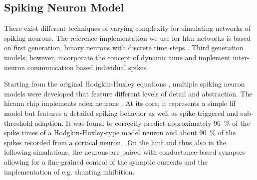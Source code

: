 \subsection{Spiking Neuron Model}

There exist different techniques of varying complexity for simulating networks
of spiking neurons. The reference implementation we use for \gls{htm}  networks
is  based on first generation, binary neurons with discrete time steps
\citep{nupic}. Third generation models, however, incorporate the concept of
dynamic time and implement inter-neuron communication based individual spikes.

Starting from the original Hodgkin-Huxley equations \citep{Hodgkin1952},
multiple spiking neuron models were developed that feature different levels of
detail and abstraction. The \gls{hicann} chip implements \gls{adex} neurons
\citep{brette2005adaptive}. At its core, it represents a simple \gls{lif} model
but features a detailed spiking behavior as well as spike-triggered and
sub-threshold adaption. It was found to correctly predict approximately
\SI{96}{\%} of the spike times of a Hodgkin-Huxley-type model neuron and about
\SI{90}{\%} of the spikes recorded from a cortical neuron
\citep{jolivet2008quantitative}. On the \gls{hmf} and thus also in the following
simulations, the neurons are paired with conductance-based synapses allowing for
a fine-grained control of the synaptic currents and the implementation of e.g.
shunting inhibition.
